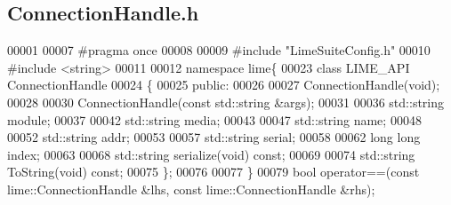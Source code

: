\subsection{Connection\+Handle.\+h}
\label{ConnectionHandle_8h_source}

\begin{DoxyCode}
00001 
00007 \textcolor{preprocessor}{#pragma once}
00008 
00009 \textcolor{preprocessor}{#include "LimeSuiteConfig.h"}
00010 \textcolor{preprocessor}{#include <string>}
00011 
00012 \textcolor{keyword}{namespace }lime\{
00023 \textcolor{keyword}{class }LIME_API ConnectionHandle
00024 \{
00025 \textcolor{keyword}{public}:
00026 
00027     ConnectionHandle(\textcolor{keywordtype}{void});
00028 
00030     ConnectionHandle(\textcolor{keyword}{const} std::string &args);
00031 
00036     std::string module;
00037 
00042     std::string media;
00043 
00047     std::string name;
00048 
00052     std::string addr;
00053 
00057     std::string serial;
00058 
00062     \textcolor{keywordtype}{long} \textcolor{keywordtype}{long} index;
00063 
00068     std::string serialize(\textcolor{keywordtype}{void}) \textcolor{keyword}{const};
00069 
00074     std::string ToString(\textcolor{keywordtype}{void}) \textcolor{keyword}{const};
00075 \};
00076 
00077 \}
00079 \textcolor{keywordtype}{bool} operator==(\textcolor{keyword}{const} lime::ConnectionHandle &lhs, \textcolor{keyword}{const} lime::ConnectionHandle &rhs);
\end{DoxyCode}
